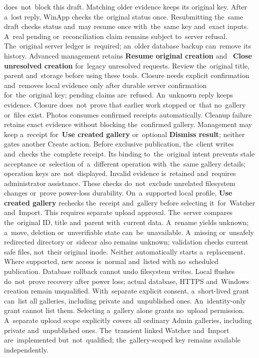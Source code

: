 \documentclass[11pt,a4paper]{article}
\newcommand{\ui}[1]{\textbf{#1}}
\begin{document}
does~not~block this draft. Matching older evidence keeps its original key.
After a~lost reply, WinApp checks the~original status once. Resubmitting
the~same draft checks status and~may resume once with~the~same key and~exact
inputs. A~real pending or~reconciliation claim remains subject to~server
refusal. The~original server ledger is~required; an~older database backup
can~remove its history.
Advanced management retains \ui{Resume original creation} and~
\ui{Close unresolved creation} for~legacy unresolved requests. Review
the~original title, parent and~storage before using these tools. Closure needs
explicit confirmation and~removes local evidence only after durable server
confirmation for~the~original key; pending claims are~refused. An~unknown
reply keeps evidence. Closure does~not~prove that earlier work stopped
or~that no~gallery or~files exist.
Photos consumes confirmed receipts automatically. Cleanup failure retains
exact evidence without blocking the~confirmed gallery. Management may keep
a~receipt for~\ui{Use created gallery} or~optional \ui{Dismiss result};
neither gates another Create action. Before exclusive publication, the~client
writes and~checks the~complete receipt. Its binding to~the~original intent
prevents stale acceptance or~selection of~a~different operation with~the~same
gallery details; operation keys are~not~displayed. Invalid evidence is~retained
and~requires administrator assistance.
These checks do~not~exclude unrelated filesystem changes or~prove power-loss
durability. On~a~supported local profile, \ui{Use created gallery}
rechecks the~receipt and~gallery before selecting it~for~Watcher and~Import.
This requires separate upload approval. The~server compares the~original ID, title and~parent
with~current data. A~rename yields unknown; a~move, deletion or~unverifiable
state can~be~unavailable. A~missing or~unsafely redirected directory or~sidecar
also remains unknown; validation checks current safe files, not~their original
inode. Neither automatically starts a~replacement.
Where supported, new access is~normal and~listed with no~scheduled publication.
Database
rollback cannot undo filesystem writes. Local flushes do~not~prove recovery
after power loss; actual database, HTTPS and~Windows creation remain unqualified.
With~separate explicit consent, a~short-lived grant can~list all galleries,
including private and~unpublished ones. An~identity-only grant cannot list
them. Selecting a~gallery alone grants no~upload permission. A~separate upload
scope explicitly covers all ordinary Admin galleries, including private
and~unpublished ones. The~transient linked Watcher and~Import are~implemented
but~not~qualified; the~gallery-scoped key remains available independently.
\end{document}
